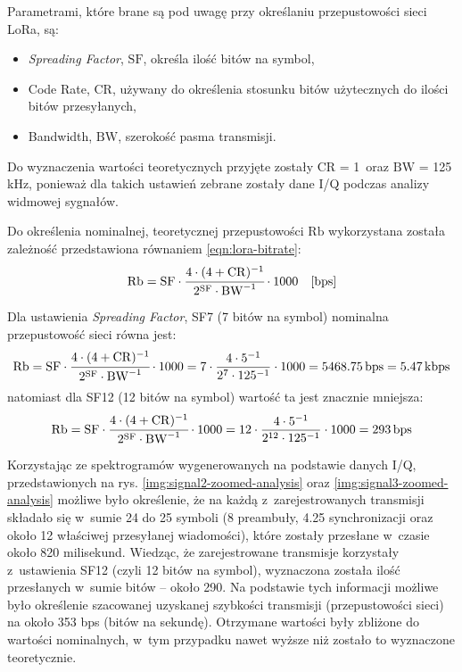 Parametrami, które brane są pod uwagę przy określaniu przepustowości sieci LoRa, są:
\begin{itemize}[label=--]
    \item \textsl{Spreading Factor}, $\mathrm{SF}$, określa ilość bitów na symbol,
    \item Code Rate, $\mathrm{CR}$, używany do określenia stosunku bitów użytecznych do ilości bitów przesyłanych,
    \item Bandwidth, $\mathrm{BW}$, szerokość pasma transmisji.
\end{itemize}
Do wyznaczenia wartości teoretycznych przyjęte zostały $\mathrm{CR}$ = 1~oraz $\mathrm{BW}$ = 125 kHz, ponieważ dla
takich ustawień zebrane zostały dane I/Q podczas analizy widmowej sygnałów.

Do określenia nominalnej, teoretycznej przepustowości $\mathrm{Rb}$ wykorzystana została zależność przedstawiona
równaniem \ref{eqn:lora-bitrate}:
\begin{equation}\label{eqn:lora-bitrate}
    \mathrm{Rb} = \mathrm{SF}\cdot\cfrac{4\cdot{(4+\mathrm{CR})^{-1}}}{2^{\mathrm{SF}}\cdot{\mathrm{BW}^{-1}}}\cdot{1000}\quad\text{[bps]}
\end{equation}

Dla ustawienia \textsl{Spreading Factor}, SF7 (7 bitów na symbol) nominalna przepustowość sieci równa jest:
\begin{equation*}
    \mathrm{Rb} = \mathrm{SF}\cdot\cfrac{4\cdot{(4+\mathrm{CR})^{-1}}}{2^{\mathrm{SF}}\cdot{\mathrm{BW}^{-1}}}\cdot{1000} = 7 \cdot \frac{4 \cdot 5^{-1}}{2^7\cdot 125^{-1}} \cdot 1000 = 5468.75\,\text{bps} = 5.47\,\text{kbps}
\end{equation*}
natomiast dla SF12 (12 bitów na symbol) wartość ta jest znacznie mniejsza:
\begin{equation*}
    \mathrm{Rb} = \mathrm{SF}\cdot\cfrac{4\cdot{(4+\mathrm{CR})^{-1}}}{2^{\mathrm{SF}}\cdot{\mathrm{BW}^{-1}}}\cdot{1000} = 12 \cdot \frac{4 \cdot 5^{-1}}{2^{12}\cdot 125^{-1}} \cdot 1000 = 293\,\text{bps}
\end{equation*}

Korzystając ze spektrogramów wygenerowanych na podstawie danych I/Q, przedstawionych na rys.
\ref{img:signal2-zoomed-analysis} oraz \ref{img:signal3-zoomed-analysis} możliwe było określenie, że na każdą
z~zarejestrowanych transmisji składało się w~sumie 24 do 25 symboli (8 preambuły, 4.25 synchronizacji oraz około 12
właściwej przesyłanej wiadomości), które zostały przesłane w~czasie około 820 milisekund. Wiedząc, że zarejestrowane
transmisje korzystały z~ustawienia SF12 (czyli 12 bitów na symbol), wyznaczona została ilość przesłanych w~sumie bitów
-- około 290. Na podstawie tych informacji możliwe było określenie szacowanej uzyskanej szybkości transmisji
(przepustowości sieci) na około 353 bps (bitów na sekundę). Otrzymane wartości były zbliżone do wartości nominalnych,
w~tym przypadku nawet wyższe niż zostało to wyznaczone teoretycznie.

